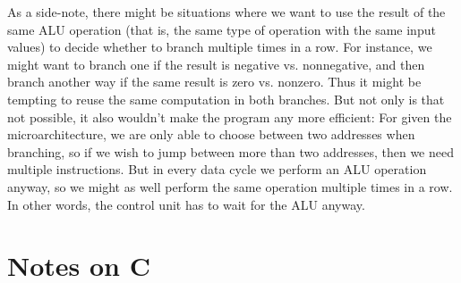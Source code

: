\documentclass[article, a4paper, 11pt, oneside]{memoir}
\numberwithin{equation}{chapter}
\begin{document}
\begin{notelist}
As a side-note, there might be situations where we want to use the result of the same ALU operation (that is, the same type of operation with the same input values) to decide whether to branch multiple times in a row. For instance, we might want to branch one if the result is negative vs. nonnegative, and then branch another way if the same result is zero vs. nonzero. Thus it might be tempting to reuse the same computation in both branches. But not only is that not possible, it also wouldn't make the program any more efficient: For given the microarchitecture, we are only able to choose between two addresses when branching, so if we wish to jump between more than two addresses, then we need multiple instructions. But in every data cycle we perform an ALU operation anyway, so we might as well perform the same operation multiple times in a row. In other words, the control unit has to wait for the ALU anyway.

\end{notelist}


\appendix

\chapter{Notes on C}

\end{document}
